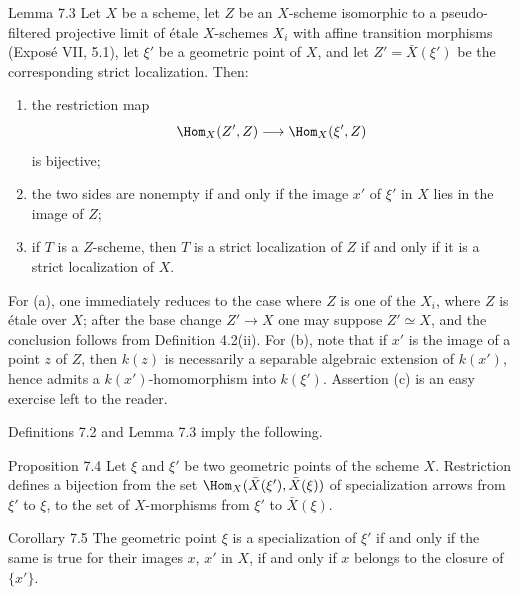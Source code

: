 \begin{statement}{Lemma 7.3}
Let \(X\) be a scheme, let \(Z\) be an \(X\)-scheme isomorphic to a pseudo-filtered projective limit of \'etale \(X\)-schemes \(X_i\) with affine transition morphisms (Expos\'e VII, 5.1), let \(\xi'\) be a geometric point of \(X\), and let \(Z'=\bar X(\xi')\) be the corresponding strict localization. Then:
\begin{enumerate}[label=\alph*)]
\item the restriction map
\[
\Hom_X(Z',Z)\longrightarrow \Hom_X(\xi',Z)
\]
is bijective;
\item the two sides are nonempty if and only if the image \(x'\) of \(\xi'\) in \(X\) lies in the image of \(Z\);
\item if \(T\) is a \(Z\)-scheme, then \(T\) is a strict localization of \(Z\) if and only if it is a strict localization of \(X\).
\end{enumerate}
\end{statement}

\begin{prooftext}
For (a), one immediately reduces to the case where \(Z\) is one of the \(X_i\), \ie where \(Z\) is \'etale over \(X\); after the base change \(Z'\to X\) one may suppose \(Z'\simeq X\), and the conclusion follows from Definition 4.2(ii). For (b), note that if \(x'\) is the image of a point \(z\) of \(Z\), then \(k(z)\) is necessarily a separable algebraic extension of \(k(x')\), hence admits a \(k(x')\)-homomorphism into \(k(\xi')\). Assertion (c) is an easy exercise left to the reader.
\end{prooftext}

Definitions 7.2 and Lemma 7.3 imply the following.

\begin{statement}{Proposition 7.4}
Let \(\xi\) and \(\xi'\) be two geometric points of the scheme \(X\). Restriction defines a bijection from the set \(\Hom_X(\bar X(\xi'),\bar X(\xi))\) of specialization arrows from \(\xi'\) to \(\xi\), to the set of \(X\)-morphisms from \(\xi'\) to \(\bar X(\xi)\).
\end{statement}

\begin{statement}{Corollary 7.5}
The geometric point \(\xi\) is a specialization of \(\xi'\) if and only if the same is true for their images \(x\), \(x'\) in \(X\), \ie if and only if \(x\) belongs to the closure of \(\{x'\}\).
\end{statement}

